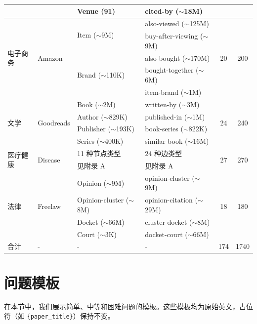 \documentclass[11pt,UTF8,fontset=fandol]{ctexart}
\begin{document}
\begin{table}[H]
\begin{tabular}{llllcc}
 &  & Venue (91) & cited-by ($\sim$18M) &  &  \\
\midrule
\multirow{5}{*}{电子商务} & \multirow{5}{*}{Amazon} & \multirow{2}{*}{Item ($\sim$9M)} & also-viewed ($\sim$125M) & \multirow{5}{*}{20} & \multirow{5}{*}{200} \\
 &  &  & buy-after-viewing ($\sim$9M) &  &  \\
 &  & \multirow{3}{*}{Brand ($\sim$110K)} & also-bought ($\sim$170M) &  &  \\
 &  &  & bought-together ($\sim$6M) &  &  \\
 &  &  & item-brand ($\sim$1M) &  &  \\
\midrule
\multirow{4}{*}{文学} & \multirow{4}{*}{Goodreads} & Book ($\sim$2M) & written-by ($\sim$3M) & \multirow{4}{*}{24} & \multirow{4}{*}{240} \\
 &  & Author ($\sim$829K) & published-in ($\sim$1M) &  &  \\
 &  & Publisher ($\sim$193K) & book-series ($\sim$822K) &  &  \\
 &  & Series ($\sim$400K) & similar-book ($\sim$16M) &  &  \\
\midrule
\multirow{2}{*}{医疗健康} & \multirow{2}{*}{Disease} & 11 种节点类型 & 24 种边类型 & \multirow{2}{*}{27} & \multirow{2}{*}{270} \\
 &  & 见附录 A & 见附录 A &  &  \\
\midrule
\multirow{4}{*}{法律} & \multirow{4}{*}{Freelaw} & Opinion ($\sim$9M) & opinion-cluster ($\sim$9M) & \multirow{4}{*}{18} & \multirow{4}{*}{180} \\
 &  & Opinion-cluster ($\sim$8M) & opinion-citation ($\sim$29M) &  &  \\
 &  & Docket ($\sim$66M) & cluster-docket ($\sim$8M) &  &  \\
 &  & Court ($\sim$3K) & docket-court ($\sim$66M) &  &  \\
\midrule
合计 & - & - & - & 174 & 1740 \\
\bottomrule
\end{tabular}
\end{table}

\section{问题模板}

在本节中，我们展示简单、中等和困难问题的模板。这些模板均为原始英文，占位符（如 \texttt{\{paper\_title\}}）保持不变。
\end{document}

